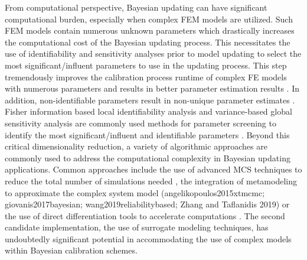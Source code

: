 From computational perspective, Bayesian updating can have significant computational burden, especially when complex FEM models are utilized. Such FEM models contain numerous unknown parameters which drastically increases the computational cost of the Bayesian updating process. This necessitates the use of identifiability and sensitivity analyses prior to model updating to select the most significant/influent parameters to use in the updating process. This step tremendously improves the calibration process runtime of complex FE models with numerous parameters and results in better parameter estimation results \citep{ramancha2021bayesianupdating}. In addition, non-identifiable parameters result in non-unique parameter estimates \citep{ramancha2020nonunique}. Fisher information based local identifiability analysis and variance-based global sensitivity analysis are commonly used methods for parameter screening to identify the most significant/influent and identifiable parameters \citep{ramancha2021bayesianupdating}. Beyond this critical dimensionality reduction, a variety of algorithmic approaches are commonly used to address the computational complexity in Bayesian updating applications. Common approaches include the use of advanced MCS techniques to reduce the total number of simulations needed \citep{quiroz2018speeding}, the integration of metamodeling to approximate the complex system model (angelikopoulos2015xtmcmc; giovanis2017bayesian; wang2019reliabilitybased; Zhang and Taflanidis 2019) or the use of direct differentiation tools to accelerate computations \citep{astroza2017batch}. The second candidate implementation, the use of surrogate modeling techniques, has undoubtedly significant potential in accommodating the use of complex models within Bayesian calibration schemes.     

